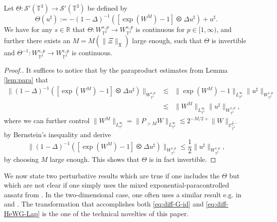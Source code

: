 \begin{lem}
  \label{lem:homeom-Theta}Let $\Theta : \mathcal{S}' (\mathbb{T}^3)
  \rightarrow \mathcal{S}' (\mathbb{T}^3)$ be defined by
  \begin{equation}
    \Theta (u^{\sharp}) := - (1 - \Delta)^{- 1} ([\exp (W^M) - 1]
    \olessthan \Delta u^{\sharp}) + u^{\sharp} . \label{eq:def-Theta-map}
  \end{equation}
  We have for any $s \in \mathbb{R}$ that $\Theta : W_{\mathbb{T}^3}^{s, p}
  \rightarrow W_{\mathbb{T}^3}^{s, p}$ is continuous for $p \in [1, \infty)$,
  and further there exists an $M = M (\| \Xi \|_{\mathfrak{X}})$ large enough,
  such that $\Theta$ is invertible and $\Theta^{- 1} : W_{\mathbb{T}^3}^{s, p}
  \rightarrow W_{\mathbb{T}^3}^{s, p}$ is continuous.
  
  \begin{proof}[Proof.]
    It suffices to notice that by the paraproduct estimates from Lemma
    \ref{lem:para} that
    \begin{eqnarray*}
      \| (1 - \Delta)^{- 1} ([\exp (W^M) - 1] \olessthan \Delta u^{\sharp})
      \|_{W_{\mathbb{T}^3}^{s, p}} & \lesssim & \| \exp (W^M) - 1
      \|_{L_{\mathbb{T}^3}^{\infty}} \| u^{\sharp} \|_{W_{\mathbb{T}^3}^{s,
      p}}\\
      & \lesssim & \| W^M \|_{L_{\mathbb{T}^3}^{\infty}} \| u^{\sharp}
      \|_{W_{\mathbb{T}^3}^{s, p}},
    \end{eqnarray*}
    where we can further control $\| W^M \|_{L_{\mathbb{T}^3}^{\infty}} = \|
    P_{> M} W \|_{L_{\mathbb{T}^3}^{\infty}} \lesssim 2^{- M / 2 +} \| W
    \|_{\mathcal{C}_{\mathbb{T}^3}^{\frac{1}{2} -}}$ by Bernstein's inequality and
    derive
    \begin{equation}
      \| (1 - \Delta)^{- 1} ([\exp (W^M) - 1] \olessthan \Delta u^{\sharp})
      \|_{W_{\mathbb{T}^3}^{s, p}} \leq \frac{1}{2} \| u^{\sharp}
      \|_{W_{\mathbb{T}^3}^{s, p}},
    \end{equation}
    by choosing $M$ large enough. This shows that $\Theta$ is in fact
    invertible.
  \end{proof}
\end{lem}

We now state two perturbative results which are true if one includes the
$\Theta$ but which are not clear if one simply uses the mixed
exponential-paracontrolled ansatz from {\cite{GUZ20}}. In the two-dimensional
case, one often uses a similar result e.g. in {\cite{Z19}} and {\cite{MZ24}}.
The transformation that accomplishes both \eqref{eq:diff-G-id} and
\eqref{eq:diff-HeWG-Lap} is the one of the technical novelties of this paper.

